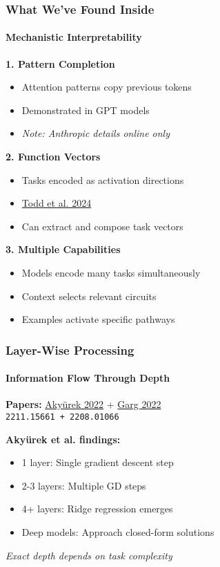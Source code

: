 \documentclass[10pt,aspectratio=169]{beamer}
\begin{document}
\begin{frame}
\frametitle{What We've Found Inside}
\framesubtitle{Mechanistic Interpretability}

\textbf{1. Pattern Completion}
\begin{itemize}
    \item Attention patterns copy previous tokens
    \item Demonstrated in GPT models
    \item \textit{Note: Anthropic details online only}
\end{itemize}

\vspace{0.3cm}
\textbf{2. Function Vectors} 
\begin{itemize}
    \item Tasks encoded as activation directions
    \item \href{papers/2310.15213_function_vectors.pdf}{\color{blue}Todd et al. 2024}
    \item Can extract and compose task vectors
\end{itemize}

\vspace{0.3cm}
\textbf{3. Multiple Capabilities}
\begin{itemize}
    \item Models encode many tasks simultaneously
    \item Context selects relevant circuits
    \item Examples activate specific pathways
\end{itemize}
\end{frame}

\begin{frame}
\frametitle{Layer-Wise Processing}
\framesubtitle{Information Flow Through Depth}

\begin{center}
\Large
\textbf{Papers:} \href{papers/2211.15661_learning_algorithm.pdf}{\color{blue}Akyürek 2022} + \href{papers/2208.01066_what_can_transformers_learn.pdf}{\color{blue}Garg 2022}\\\small{\texttt{2211.15661 + 2208.01066}}
\end{center}

\vspace{0.5cm}

\textbf{Akyürek et al. findings:}
\begin{itemize}
    \item 1 layer: Single gradient descent step
    \item 2-3 layers: Multiple GD steps  
    \item 4+ layers: Ridge regression emerges
    \item Deep models: Approach closed-form solutions
\end{itemize}

\textit{Exact depth depends on task complexity}
\end{frame}
\end{document}
